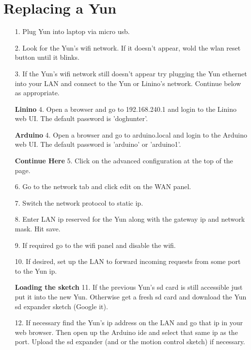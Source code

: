 \documentclass[11pt]{article}
\begin{document}
\section{Replacing a Yun}
\begin{enumerate}
\item[1.]Plug Yun into laptop via micro usb.
\item[2.] Look for the Yun's wifi network. If it doesn't appear, wold the wlan reset button until it blinks.
\item[3.] If the Yun's wifi network still doesn't appear try plugging the Yun ethernet into your LAN and connect to the Yun or Linino's network. Continue below as appropriate.\\
\item[\textbf{Linino} 4.] Open a browser and go to 192.168.240.1 and login to the Linino web UI. The default password is 'doghunter'.
\item[\textbf{Arduino} 4.] Open a browser and go to arduino.local and login to the Arduino web UI. The default password is 'arduino' or 'arduino1'.\\
\item[\textbf{Continue Here} 5.] Click on the advanced configuration at the top of the page.
\item[6.] Go to the network tab and click edit on the WAN panel.
\item[7.] Switch the network protocol to static ip.
\item[8.] Enter LAN ip reserved for the Yun along with the gateway ip and network mask. Hit save.
\item[9.] If required go to the wifi panel and disable the wifi.

\item[10.] If desired, set up the LAN to forward incoming requests from some port to the Yun ip.\\
\item[\textbf{Loading the sketch} 11.] If the previous Yun's sd card is still accessible just put it into the new Yun. Otherwise get a fresh sd card and download the Yun sd expander sketch (Google it).
\item[12.]If necessary find the Yun's ip address on the LAN and go that ip in your web browser. Then open up the Arduino ide and select that same ip as the port. Upload the sd expander (and or the motion control sketch) if necessary.
\end{enumerate}
\end{document}
